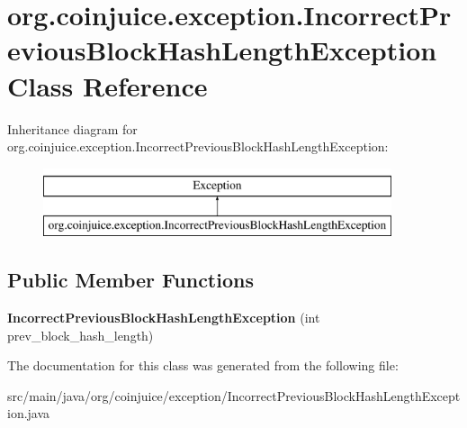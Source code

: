\hypertarget{classorg_1_1coinjuice_1_1exception_1_1_incorrect_previous_block_hash_length_exception}{\section{org.\-coinjuice.\-exception.\-Incorrect\-Previous\-Block\-Hash\-Length\-Exception Class Reference}
\label{classorg_1_1coinjuice_1_1exception_1_1_incorrect_previous_block_hash_length_exception}
}
Inheritance diagram for org.\-coinjuice.\-exception.\-Incorrect\-Previous\-Block\-Hash\-Length\-Exception\-:\begin{figure}[H]
\begin{center}
\leavevmode
\includegraphics[height=2.000000cm]{classorg_1_1coinjuice_1_1exception_1_1_incorrect_previous_block_hash_length_exception}
\end{center}
\end{figure}
\subsection*{Public Member Functions}
\begin{DoxyCompactItemize}
\item 
\hypertarget{classorg_1_1coinjuice_1_1exception_1_1_incorrect_previous_block_hash_length_exception_a4675ba5bd668c9dc2997592a3ae1be26}{{\bfseries Incorrect\-Previous\-Block\-Hash\-Length\-Exception} (int prev\-\_\-block\-\_\-hash\-\_\-length)}\label{classorg_1_1coinjuice_1_1exception_1_1_incorrect_previous_block_hash_length_exception_a4675ba5bd668c9dc2997592a3ae1be26}

\end{DoxyCompactItemize}


The documentation for this class was generated from the following file\-:\begin{DoxyCompactItemize}
\item 
src/main/java/org/coinjuice/exception/Incorrect\-Previous\-Block\-Hash\-Length\-Exception.\-java\end{DoxyCompactItemize}
